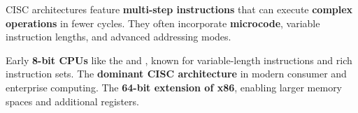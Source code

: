 \begin{NxSSBox}
	\begin{NxIDBox}
		CISC architectures feature \textbf{multi-step instructions} that can execute \textbf{complex operations} in fewer cycles. They often incorporate \textbf{microcode}, variable instruction lengths, and advanced addressing modes.
	\end{NxIDBox}
	\begin{NxIDBoxL}
		 Early \textbf{8-bit CPUs} like the  and , known for variable-length instructions and rich instruction sets.
		 The \textbf{dominant CISC architecture} in modern consumer and enterprise computing.
		 The \textbf{64-bit extension of x86}, enabling larger memory spaces and additional registers.
	\end{NxIDBoxL}
\end{NxSSBox}

%
%

%



